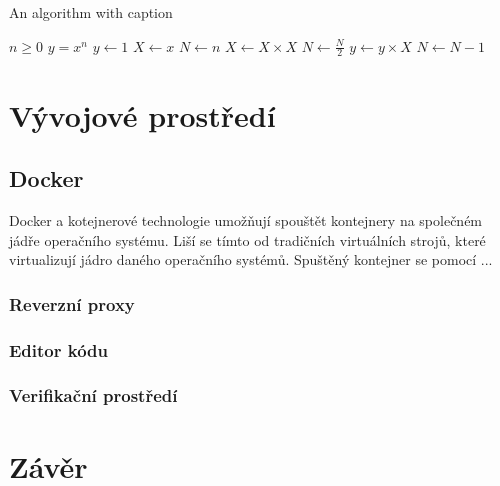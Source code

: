 \begin{algorithm}
	\caption{An algorithm with caption}\label{alg:cap}
	\begin{algorithmic}
		\Require $n \geq 0$
		\Ensure $y = x^n$
		\State $y \gets 1$
		\State $X \gets x$
		\State $N \gets n$
		    \State $X \gets X \times X$
		    \State $N \gets \frac{N}{2}$  
		    \State $y \gets y \times X$
		    \State $N \gets N - 1$
		\EndIf
		\EndWhile
	\end{algorithmic}
\end{algorithm}

\chapter{Vývojové prostředí}
\label{chapter:development-environment}

\section{Docker}

Docker a kotejnerové technologie umožňují spouštět kontejnery na společném jádře operačního systému. Liší se tímto od tradičních virtuálních strojů, které virtualizují jádro daného operačního systémů. Spuštěný kontejner se pomocí ... \cite{LinuxBible2020}

\subsection{Reverzní proxy}

\subsection{Editor kódu}

\subsection{Verifikační prostředí}

\chapter*{Závěr}

